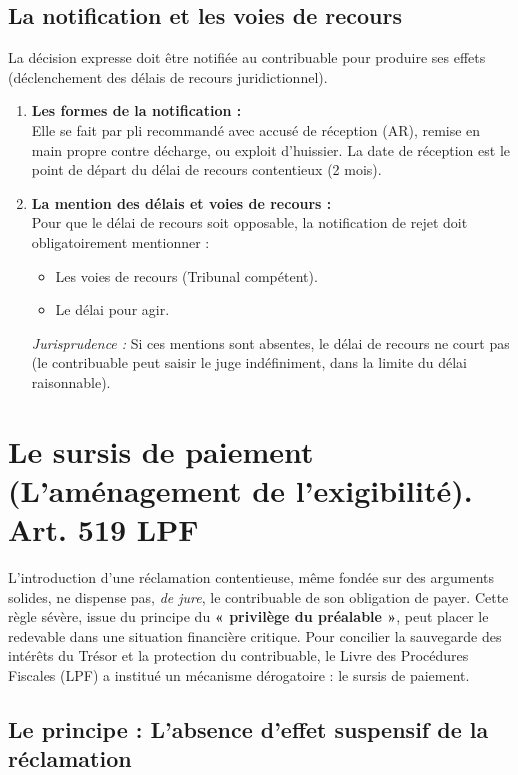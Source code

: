 \documentclass[Cours_contentieuxTF2026.tex]{subfiles}
\begin{document}
\subsection{La notification et les voies de recours}

La décision expresse doit être notifiée au contribuable pour produire ses effets (déclenchement des délais de recours juridictionnel).

\begin{enumerate}
	\item \textbf{Les formes de la notification :} \\
	Elle se fait par pli recommandé avec accusé de réception (AR), remise en main propre contre décharge, ou exploit d'huissier. La date de réception est le point de départ du délai de recours contentieux (2 mois).
	
	\item \textbf{La mention des délais et voies de recours :} \\
	Pour que le délai de recours soit opposable, la notification de rejet doit obligatoirement mentionner :
	\begin{itemize}
		\item Les voies de recours (Tribunal compétent).
		\item Le délai pour agir.
	\end{itemize}
	\textit{Jurisprudence :} Si ces mentions sont absentes, le délai de recours ne court pas (le contribuable peut saisir le juge indéfiniment, dans la limite du délai raisonnable).
\end{enumerate}

\section{Le sursis de paiement (L'aménagement de l'exigibilité). Art. 519 LPF}
\label{sec: sursi_paiement}
L'introduction d'une réclamation contentieuse, même fondée sur des arguments solides, ne dispense pas, \textit{de jure}, le contribuable de son obligation de payer. Cette règle sévère, issue du principe du \textbf{« privilège du préalable »}, peut placer le redevable dans une situation financière critique.
Pour concilier la sauvegarde des intérêts du Trésor et la protection du contribuable, le Livre des Procédures Fiscales (LPF) a institué un mécanisme dérogatoire : le sursis de paiement.

\subsection{Le principe : L'absence d'effet suspensif de la réclamation}
\end{document}
